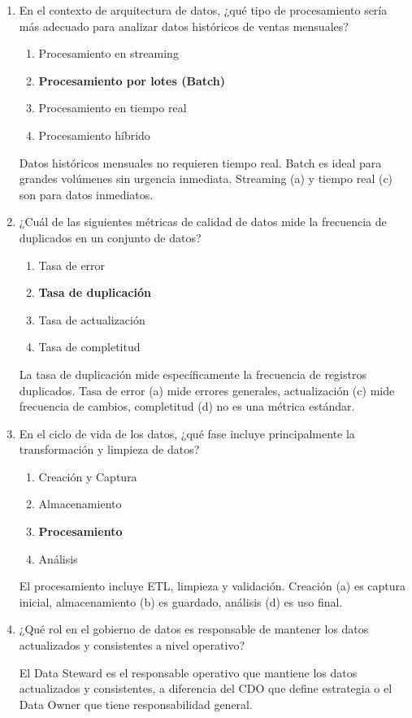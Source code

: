 \documentclass[12pt]{article}
\begin{document}
\begin{enumerate}[label=\arabic*.]
\item En el contexto de arquitectura de datos, ¿qué tipo de procesamiento sería más adecuado para analizar datos históricos de ventas mensuales?
\begin{enumerate}
    \item Procesamiento en streaming
    \item \textbf{Procesamiento por lotes (Batch)}
    \item Procesamiento en tiempo real
    \item Procesamiento híbrido
\end{enumerate}
Datos históricos mensuales no requieren tiempo real. Batch es ideal para grandes volúmenes sin urgencia inmediata. Streaming (a) y tiempo real (c) son para datos inmediatos.

\item ¿Cuál de las siguientes métricas de calidad de datos mide la frecuencia de duplicados en un conjunto de datos?
\begin{enumerate}
    \item Tasa de error
    \item \textbf{Tasa de duplicación}
    \item Tasa de actualización
    \item Tasa de completitud
\end{enumerate}
La tasa de duplicación mide específicamente la frecuencia de registros duplicados. Tasa de error (a) mide errores generales, actualización (c) mide frecuencia de cambios, completitud (d) no es una métrica estándar.

\item En el ciclo de vida de los datos, ¿qué fase incluye principalmente la transformación y limpieza de datos?
\begin{enumerate}
    \item Creación y Captura
    \item Almacenamiento
    \item \textbf{Procesamiento}
    \item Análisis
\end{enumerate}
El procesamiento incluye ETL, limpieza y validación. Creación (a) es captura inicial, almacenamiento (b) es guardado, análisis (d) es uso final.

\item ¿Qué rol en el gobierno de datos es responsable de mantener los datos actualizados y consistentes a nivel operativo?

El Data Steward es el responsable operativo que mantiene los datos actualizados y consistentes, a diferencia del CDO que define estrategia o el Data Owner que tiene responsabilidad general.


\end{enumerate}
\end{document}
